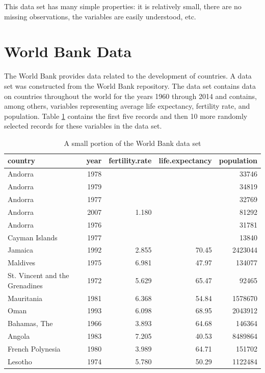 \documentclass[]{krantz}
\begin{document}
This data set has many simple properties: it is relatively small, there
are no missing observations, the variables are easily understood, etc.

\section{World Bank Data}\label{world-bank-data}

The World Bank provides data related to the development of countries. A
data set was constructed from the World Bank repository. The data set
contains data on countries throughout the world for the years 1960
through 2014 and contains, among others, variables representing average
life expectancy, fertility rate, and population. Table
\ref{tab:worldBank} contains the first five records and then 10 more
randomly selected records for these variables in the data set.

\begin{table}[t]

\caption{\label{tab:worldBank}A small portion of the World Bank data set}
\centering
\begin{tabular}{lrrrr}
\toprule
country & year & fertility.rate & life.expectancy & population\\
\midrule
Andorra & 1978 &  &  & 33746\\
Andorra & 1979 &  &  & 34819\\
Andorra & 1977 &  &  & 32769\\
Andorra & 2007 & 1.180 &  & 81292\\
Andorra & 1976 &  &  & 31781\\
\addlinespace
Cayman Islands & 1977 &  &  & 13840\\
Jamaica & 1992 & 2.855 & 70.45 & 2423044\\
Maldives & 1975 & 6.981 & 47.97 & 134077\\
St. Vincent and the Grenadines & 1972 & 5.629 & 65.47 & 92465\\
Mauritania & 1981 & 6.368 & 54.84 & 1578670\\
\addlinespace
Oman & 1993 & 6.098 & 68.95 & 2043912\\
Bahamas, The & 1966 & 3.893 & 64.68 & 146364\\
Angola & 1983 & 7.205 & 40.53 & 8489864\\
French Polynesia & 1980 & 3.989 & 64.71 & 151702\\
Lesotho & 1974 & 5.780 & 50.29 & 1122484\\
\bottomrule
\end{tabular}
\end{table}
\end{document}
